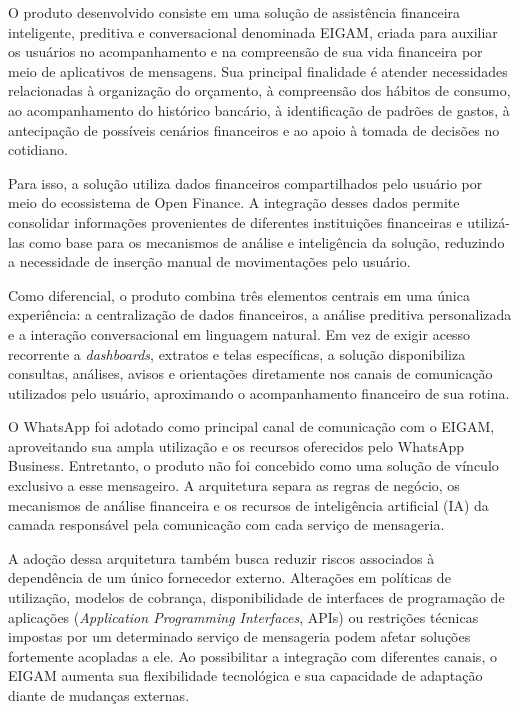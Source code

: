 O produto desenvolvido consiste em uma solução de assistência financeira inteligente, preditiva e conversacional denominada EIGAM, criada para auxiliar os usuários no acompanhamento e na compreensão de sua vida financeira por meio de aplicativos de mensagens. Sua principal finalidade é atender necessidades relacionadas à organização do orçamento, à compreensão dos hábitos de consumo, ao acompanhamento do histórico bancário, à identificação de padrões de gastos, à antecipação de possíveis cenários financeiros e ao apoio à tomada de decisões no cotidiano.

Para isso, a solução utiliza dados financeiros compartilhados pelo usuário por meio do ecossistema de Open Finance. A integração desses dados permite consolidar informações provenientes de diferentes instituições financeiras e utilizá-las como base para os mecanismos de análise e inteligência da solução, reduzindo a necessidade de inserção manual de movimentações pelo usuário.

Como diferencial, o produto combina três elementos centrais em uma única experiência: a centralização de dados financeiros, a análise preditiva personalizada e a interação conversacional em linguagem natural. Em vez de exigir acesso recorrente a \textit{dashboards}, extratos e telas específicas, a solução disponibiliza consultas, análises, avisos e orientações diretamente nos canais de comunicação utilizados pelo usuário, aproximando o acompanhamento financeiro de sua rotina.

O WhatsApp foi adotado como principal canal de comunicação com o EIGAM, aproveitando sua ampla utilização e os recursos oferecidos pelo WhatsApp Business. Entretanto, o produto não foi concebido como uma solução de vínculo exclusivo a esse mensageiro. A arquitetura separa as regras de negócio, os mecanismos de análise financeira e os recursos de inteligência artificial (IA) da camada responsável pela comunicação com cada serviço de mensageria.

A adoção dessa arquitetura também busca reduzir riscos associados à dependência de um único fornecedor externo. Alterações em políticas de utilização, modelos de cobrança, disponibilidade de interfaces de programação de aplicações (\textit{Application Programming Interfaces}, APIs) ou restrições técnicas impostas por um determinado serviço de mensageria podem afetar soluções fortemente acopladas a ele. Ao possibilitar a integração com diferentes canais, o EIGAM aumenta sua flexibilidade tecnológica e sua capacidade de adaptação diante de mudanças externas.

